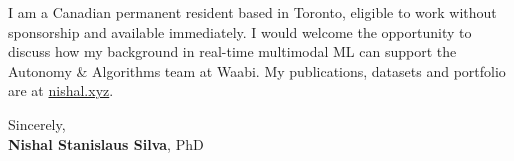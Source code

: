 \documentclass[11pt]{article}
\newcommand{\clName}{Nishal Stanislaus Silva}
\newcommand{\clSite}{https://nishal.xyz}
\newcommand{\clTeam}{the Autonomy \& Algorithms team}
\begin{document}
I am a Canadian permanent resident based in Toronto, eligible to work without sponsorship and available immediately. I would welcome the opportunity to discuss how my background in real-time multimodal ML can support \clTeam{} at Waabi. My publications, datasets and portfolio are at \href{\clSite}{nishal.xyz}.

\vspace{12pt}
Sincerely,\\[2pt]
\textbf{\clName}, PhD
\end{document}
